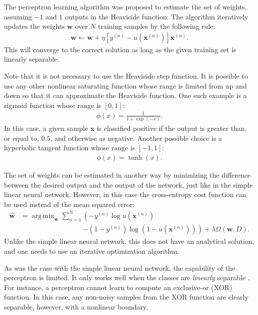 \documentclass[dissertation,nocontribution,draft*]{aaltoseries}
\newcommand{\vect}[1]{\mathbf{#1}}
\newcommand{\vx}[0]{\vect{x}}
\newcommand{\vw}[0]{\vect{w}}
\DeclareMathOperator*{\argmin}{arg\,min}
\begin{document}
The perceptron learning algorithm was proposed  to estimate
the set of weights, assuming $-1$ and $1$ outputs in the
Heaviside function. The algorithm iteratively updates the
weights $\vw$ over $N$ training samples by the following
rule:
\begin{align*}
    \vw \leftarrow \vw + \eta \left[ y^{(n)} -
    u\left(\vx^{(n)}\right)
    \right] \vx^{(n)}.
\end{align*}
This will converge to the correct solution as long as the
given training set is linearly separable.

Note that it is not necessary to use the Heaviside step
function. It is possible to use any other nonlinear
saturating function whose range is limited from up and down
so that it can approximate the Heaviside function.  One such
example is a sigmoid function whose range
is $\left[ 0, 1 \right]$:
\begin{align}
    \label{eq:sigmoid}
    \phi(x) = \frac{1}{1 + \exp\left( -x\right)}.
\end{align}
In this case, a given sample $\vx$ is classified positive
if the output is greater than, or equal to, $0.5$, and
otherwise as negative. Another possible choice is a
hyperbolic tangent function whose range is $\left[ -1, 1
\right]$:
\begin{align}
    \label{eq:tanh}
    \phi(x) = \tanh(x).
\end{align}

The set of weights can be estimated in another way by
minimizing the difference between the desired output and the
output of the network, just like in the simple linear neural
network. However, in this case the cross-entropy cost
function \citep[see, e.g.][]{Bishop2006} can be used instead
of the mean squared error:
\begin{align}
    \label{eq:crossentropy_cost}
    \hat{\vw} &= \argmin_{\vw} \sum_{n=1}^N \left(-y^{(n)}
    \log u\left(\vx^{(n)}\right)\right.
    \nonumber\\
    &\phantom{= \argmin_{\vw} \sum_{n=1}^N}\left.-\left(1-y^{(n)}\right)
    \log\left( 1 - 
    u\left(\vx^{(n)}\right)\right)\right) 
    + \lambda \Omega
    \left(\vw, D\right).
\end{align}
Unlike the simple linear neural network, this does not have
an analytical solution, and one needs to use an iterative
optimization algorithm.

As was the case with the simple linear neural network, the
capability of the perceptron is limited. It only works well
when the classes are \textit{linearly} separable \citep[see,
e.g.,][]{Minsky1969}. For
instance, a perceptron cannot learn to compute an
exclusive-or (XOR) function. In this case, any non-noisy
samples from the XOR function are clearly separable, however,
with a nonlinear boundary.
\end{document}
